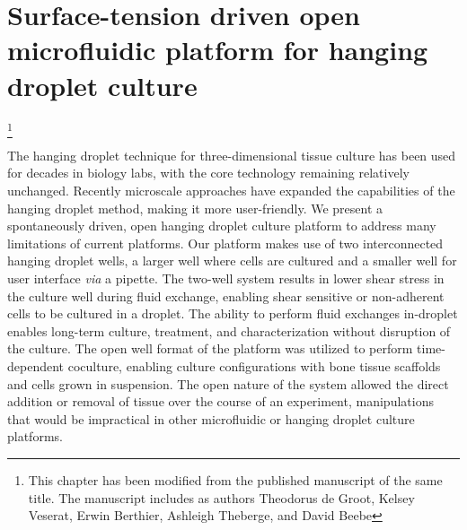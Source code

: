 \chapter{Surface-tension driven open microfluidic platform for hanging droplet culture}\footnote{This chapter has been modified from the published manuscript of the same title. The manuscript includes as authors Theodorus de Groot, Kelsey Veserat, Erwin Berthier, Ashleigh Theberge, and David Beebe}
\label{Chap:HangingDroplet}

The hanging droplet technique for three-dimensional tissue culture has been used for decades in biology labs, with the core technology remaining relatively unchanged. Recently microscale approaches have expanded the capabilities of the hanging droplet method, making it more user-friendly. We present a spontaneously driven, open hanging droplet culture platform to address many limitations of current platforms. Our platform makes use of two interconnected hanging droplet wells, a larger well where cells are cultured and a smaller well for user interface \textit{via} a pipette. The two-well system results in lower shear stress in the culture well during fluid exchange, enabling shear sensitive or non-adherent cells to be cultured in a droplet. The ability to perform fluid exchanges in-droplet enables long-term culture, treatment, and characterization without disruption of the culture. The open well format of the platform was utilized to perform time-dependent coculture, enabling culture configurations with bone tissue scaffolds and cells grown in suspension. The open nature of the system allowed the direct addition or removal of tissue over the course of an experiment, manipulations that would be impractical in other microfluidic or hanging droplet culture platforms. 


